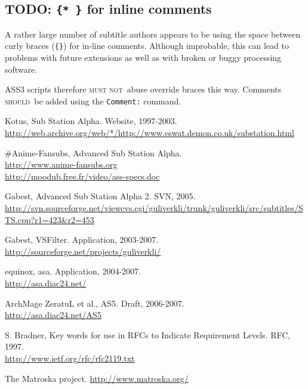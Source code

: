 \documentclass[11pt,a4paper]{article}
\newcommand{\todo}{\textbf\textsf{\color{hl}TODO: }}
\newcommand{\should}{\textsc{should}}
\newcommand{\mustnot}{\textsc{must not}}
\begin{document}
\subsection{\todo \texttt{\{* \}} for inline comments}

A rather large number of subtitle authors appears to be using the
space between curly braces (\texttt{\{\}}) for in-line comments.
Although improbable, this can lead to problems with future extensions
as well as with broken or buggy processing software.

ASS3 scripts therefore \mustnot\ abuse override braces this way. Comments
\should\ be added using the \texttt{Comment:} command.

\begin{thebibliography}{1}
 Kotus, Sub Station Alpha. Website, 1997-2003.\\
\url{http://web.archive.org/web/*/http://www.eswat.demon.co.uk/substation.html}

 \#Anime-Fansubs, Advanced Sub Station Alpha.\\
\url{http://www.anime-fansubs.org}\\
\url{http://moodub.free.fr/video/ass-specs.doc}

 Gabest, Advanced Sub Station Alpha 2. SVN, 2005.\\
\url{http://svn.sourceforge.net/viewcvs.cgi/guliverkli/trunk/guliverkli/src/subtitles/STS.cpp?r1=423&r2=453}

 Gabest, VSFilter. Application, 2003-2007.\\
\url{http://sourceforge.net/projects/guliverkli/}

 equinox, asa. Application, 2004-2007.\\
\url{http://asa.diac24.net/}

 ArchMage ZeratuL et al., AS5. Draft, 2006-2007.\\
\url{http://asa.diac24.net/AS5}

 S. Bradner, Key words for use in RFCs to Indicate Requirement Levels. RFC, 1997.\\
\url{http://www.ietf.org/rfc/rfc2119.txt}

 The Matroska project.
\url{http://www.matroska.org/}

\end{thebibliography}
\end{document}
